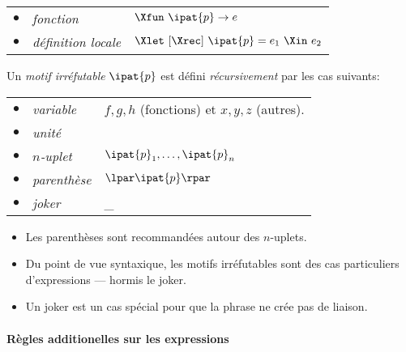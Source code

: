 \begin{tabular}{rll}
    $\bullet$
  & \emph{fonction}
  & $\Xfun \,\, \ipat{p} \rightarrow e$\\
    $\bullet$
  & \emph{définition locale}
  & $\Xlet \,\, \textrm{[}\Xrec\textrm{]} \,\, \ipat{p} = e_1 \,\,
    \Xin \,\, e_2$
\end{tabular}


Un \emph{motif irréfutable} $\ipat{p}$ est défini \emph{récursivement}
par les cas suivants:

\begin{tabular}{rll}
    $\bullet$
  & \emph{variable}
  & $f, g, h$ (fonctions) et $x, y, z$ (autres). \\
    $\bullet$
  & \emph{unité}
  & \unit\\
    $\bullet$
  & \emph{$n$-uplet}
  & $\ipat{p}_1, \ldots, \ipat{p}_n$\\
    $\bullet$
  & \emph{parenthèse}
  & $\lpar\ipat{p}\rpar$\\
    $\bullet$
  & \emph{joker}
  & {\Large \_}
\end{tabular}

\bigskip

\remarques

\begin{itemize}

  \item Les parenthèses sont recommandées autour des $n$-uplets.

  \item Du point de vue syntaxique, les motifs irréfutables sont des
  cas particuliers d'expressions --- hormis le joker.

   \item Un joker est un cas spécial pour que la phrase ne crée pas
   de liaison.

\end{itemize}

\paragraph{Règles additionelles sur les expressions}

